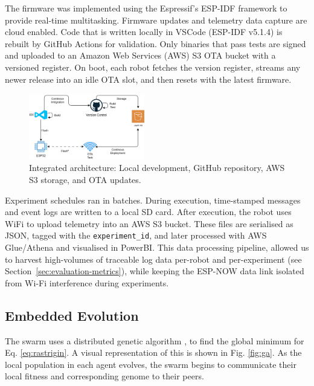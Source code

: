 \documentclass[conference]{IEEEtran}
\begin{document}
The firmware was implemented using the Espressif's ESP-IDF framework to provide real-time multitasking. Firmware updates and telemetry data capture are cloud enabled. Code that is written locally in VSCode (ESP-IDF v5.1.4) is rebuilt by GitHub Actions for validation. Only binaries that pass tests are signed and uploaded to an Amazon Web Services (AWS) S3 OTA bucket with a versioned register. On boot, each robot fetches the version register, streams any newer release into an idle OTA slot, and then resets with the latest firmware.

\begin{figure}[hb]
    \centering
    \includegraphics[width=0.45\textwidth]{architecture.png}
    \caption{Integrated architecture: Local development, GitHub repository, AWS S3 storage, and OTA updates.}
    \label{fig:cicd-architecture}
\end{figure}

Experiment schedules ran in batches. During execution, time-stamped messages and event logs are written to a local SD card. After execution, the robot uses WiFi to upload telemetry into an AWS S3 bucket. These files are serialised as JSON, tagged with the \texttt{experiment\_id}, and later processed with AWS Glue/Athena and visualised in PowerBI. This data processing pipeline, allowed us to harvest high-volumes of traceable log data per-robot and per-experiment (see Section~\ref{sec:evaluation-metrics}), while keeping the ESP-NOW data link isolated from Wi-Fi interference during experiments.


\subsection{Embedded Evolution}\label{sec:embedded-evo}

The swarm uses a distributed genetic algorithm \cite{odowd_university_2025}, to find the global minimum for Eq. \ref{eq:rastrigin}. A visual representation of this is shown in Fig. \ref{fig:ga}. As the local population in each agent evolves, the swarm begins to communicate their local fitness and corresponding genome to their peers. \\
\end{document}
